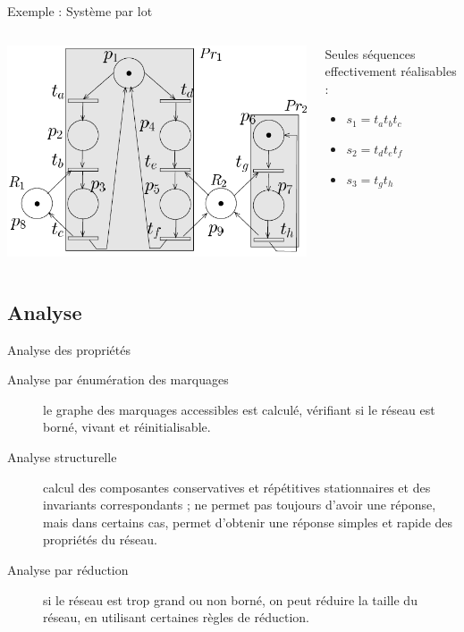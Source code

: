\documentclass[compress]{beamer}
\begin{document}
\begin{frame}{Exemple : Système par lot}
\begin{columns}
	\begin{column}{.4\linewidth}
	\begin{center}
		\includegraphics[width=\linewidth]{rea1}
	\end{center}
	\end{column}		
	\begin{column}{.65\linewidth}
		Seules séquences effectivement réalisables :
		\begin{itemize}
		\item $s_1 = t_a t_b t_c$
		\item $s_2 = t_d t_e t_f$
		\item $s_3 = t_g t_h$
		\end{itemize} 
	\end{column}
\end{columns}
\end{frame}

\subsection{Analyse}
\begin{frame}{Analyse des propriétés}
\begin{description}
\item[Analyse par énumération des marquages] le graphe des marquages accessibles est calculé, vérifiant si le réseau est borné, vivant et réinitialisable.
\item[Analyse structurelle] calcul des composantes conservatives et répétitives stationnaires et des invariants correspondants ; ne permet pas toujours d'avoir une réponse, mais dans certains cas, permet d'obtenir une réponse simples et rapide des propriétés du réseau.
\item[Analyse par réduction] si le réseau est trop grand ou non borné, on peut réduire la taille du réseau, en utilisant certaines règles de réduction.
\end{description}
\end{frame}
 
\end{document}
